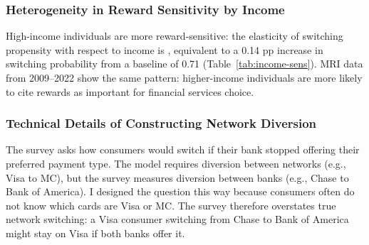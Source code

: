 \documentclass[main.tex]{subfiles}
\begin{document}
\subsubsection{Heterogeneity in Reward Sensitivity by Income}

High-income individuals are more reward-sensitive: the elasticity of switching propensity with respect to income is , equivalent to a 0.14 pp increase in switching probability from a baseline of 0.71 (Table~\ref{tab:income-sens}).
MRI data from 2009--2022 show the same pattern: higher-income individuals are more likely to cite rewards as important for financial services choice.

\begin{table}
    \caption{Income heterogeneity in rewards sensitivity}
    \label{tab:income-sens}

    \begin{center}
        \begin{small}
            
        \end{small}
    \end{center}


\end{table}

\subsubsection{Technical Details of Constructing Network Diversion}
\label{subsec:oa-network-diversion-construction}

The survey asks how consumers would switch if their bank stopped offering their preferred payment type.
The model requires diversion between networks (e.g., Visa to MC), but the survey measures diversion between banks (e.g., Chase to Bank of America).
I designed the question this way because consumers often do not know which cards are Visa or MC.
The survey therefore overstates true network switching: a Visa consumer switching from Chase to Bank of America might stay on Visa if both banks offer it.
\end{document}
